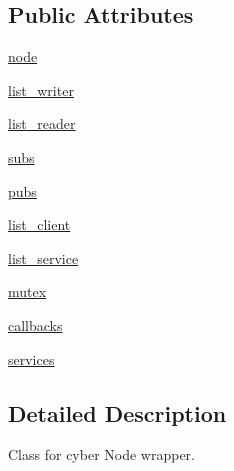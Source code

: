 \subsection*{Public Attributes}
\begin{DoxyCompactItemize}
\item 
\hyperlink{classcyber__py_1_1cyber_1_1Node_af1d1465e7e1306766e7e6e6f68126365}{node}
\item 
\hyperlink{classcyber__py_1_1cyber_1_1Node_afe737c18cc7236c5121efd49400c09ab}{list\-\_\-writer}
\item 
\hyperlink{classcyber__py_1_1cyber_1_1Node_a44dc5de2dbefff08ad9bb54cabe0a9e2}{list\-\_\-reader}
\item 
\hyperlink{classcyber__py_1_1cyber_1_1Node_aeec0921d80a2daeffe5f00df5b058532}{subs}
\item 
\hyperlink{classcyber__py_1_1cyber_1_1Node_a8f7d27e8c698ada3083a3c7074ced956}{pubs}
\item 
\hyperlink{classcyber__py_1_1cyber_1_1Node_a0f6052c868b842325fde215a09f75363}{list\-\_\-client}
\item 
\hyperlink{classcyber__py_1_1cyber_1_1Node_a5e8e78b807876e508fd5211006ec7c31}{list\-\_\-service}
\item 
\hyperlink{classcyber__py_1_1cyber_1_1Node_a4d7844d57accfe33f50304335ad065f5}{mutex}
\item 
\hyperlink{classcyber__py_1_1cyber_1_1Node_a619cab27f7ec745edf0f06d2cd3aa630}{callbacks}
\item 
\hyperlink{classcyber__py_1_1cyber_1_1Node_a362299aa1d91ea7e0e557858b3c0b826}{services}
\end{DoxyCompactItemize}


\subsection{Detailed Description}
\begin{DoxyVerb}Class for cyber Node wrapper.
\end{DoxyVerb}
 

